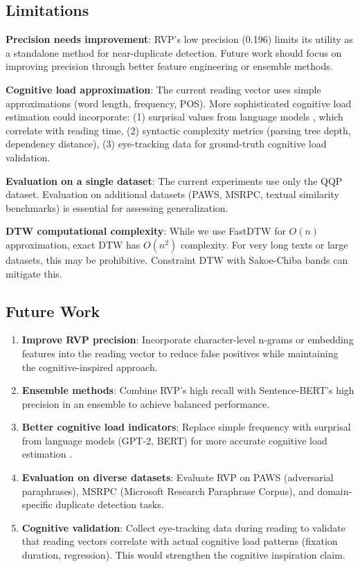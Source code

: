 \documentclass[11pt,letterpaper]{article}
\begin{document}
\subsection{Limitations}

\textbf{Precision needs improvement}: RVP's low precision (0.196) limits its utility as a standalone method for near-duplicate detection. Future work should focus on improving precision through better feature engineering or ensemble methods.

\textbf{Cognitive load approximation}: The current reading vector uses simple approximations (word length, frequency, POS). More sophisticated cognitive load estimation could incorporate: (1) surprisal values from language models \cite{Smith2013}, which correlate with reading time, (2) syntactic complexity metrics (parsing tree depth, dependency distance), (3) eye-tracking data for ground-truth cognitive load validation.

\textbf{Evaluation on a single dataset}: The current experiments use only the QQP dataset. Evaluation on additional datasets (PAWS, MSRPC, textual similarity benchmarks) is essential for assessing generalization.

\textbf{DTW computational complexity}: While we use FastDTW for $O(n)$ approximation, exact DTW has $O(n^2)$ complexity. For very long texts or large datasets, this may be prohibitive. Constraint DTW with Sakoe-Chiba bands \cite{Sakoe1978} can mitigate this.

\subsection{Future Work}

\begin{enumerate}
\item \textbf{Improve RVP precision}: Incorporate character-level n-grams or embedding features into the reading vector to reduce false positives while maintaining the cognitive-inspired approach.

\item \textbf{Ensemble methods}: Combine RVP's high recall with Sentence-BERT's high precision in an ensemble to achieve balanced performance.

\item \textbf{Better cognitive load indicators}: Replace simple frequency with surprisal from language models (GPT-2, BERT) for more accurate cognitive load estimation \cite{Smith2013}.

\item \textbf{Evaluation on diverse datasets}: Evaluate RVP on PAWS (adversarial paraphrases), MSRPC (Microsoft Research Paraphrase Corpus), and domain-specific duplicate detection tasks.

\item \textbf{Cognitive validation}: Collect eye-tracking data during reading to validate that reading vectors correlate with actual cognitive load patterns (fixation duration, regression). This would strengthen the cognitive inspiration claim.
\end{enumerate}
\end{document}
